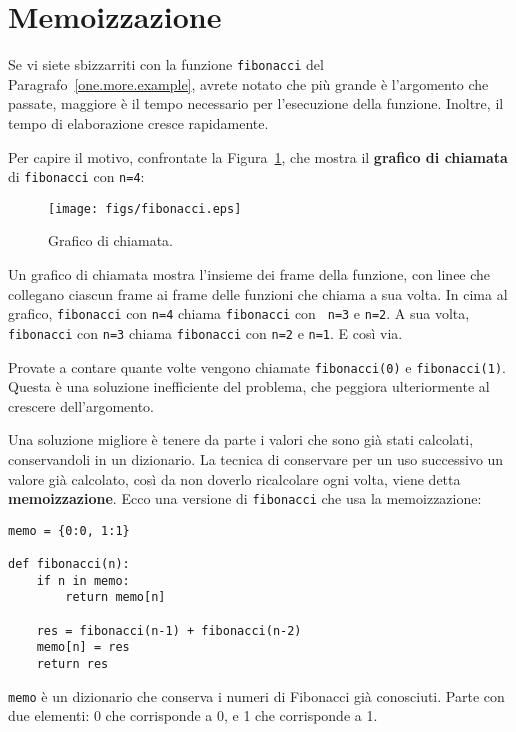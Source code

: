 \documentclass[10pt]{book}
\begin{document}
\section{Memoizzazione}
\label{memoize}

Se vi siete sbizzarriti con la funzione {\tt fibonacci} del Paragrafo~\ref{one.more.example}, avrete notato che più grande è l'argomento che passate, maggiore è il tempo necessario per l'esecuzione della funzione. Inoltre, il tempo di elaborazione cresce rapidamente.

Per capire il motivo, confrontate la Figura~\ref{fig.fibonacci}, che mostra il {\bf grafico di chiamata} di {\tt fibonacci} con {\tt n=4}:

\begin{figure}
\centerline
{\texttt{[image: figs/fibonacci.eps]}}
\caption{Grafico di chiamata.}
\label{fig.fibonacci}
\end{figure}

Un grafico di chiamata mostra l'insieme dei frame della funzione, con linee che collegano ciascun frame ai frame delle funzioni che chiama a sua volta. In cima al grafico, {\tt fibonacci} con {\tt n=4} chiama {\tt fibonacci} con {\tt
n=3} e {\tt n=2}.  A sua volta, {\tt fibonacci} con {\tt n=3} chiama
{\tt fibonacci} con {\tt n=2} e {\tt n=1}.  E così via.

Provate a contare quante volte vengono chiamate {\tt fibonacci(0)} e {\tt fibonacci(1)}. Questa è una soluzione inefficiente del problema, che peggiora ulteriormente al crescere dell'argomento.

Una soluzione migliore è tenere da parte i valori che sono già stati calcolati, conservandoli in un dizionario. La tecnica di conservare per un uso successivo un valore già calcolato, così da non doverlo ricalcolare ogni volta, viene detta {\bf memoizzazione}.  Ecco una versione di {\tt fibonacci} che usa la memoizzazione:

\begin{verbatim}
memo = {0:0, 1:1}

def fibonacci(n):
    if n in memo:
        return memo[n]

    res = fibonacci(n-1) + fibonacci(n-2)
    memo[n] = res
    return res
\end{verbatim}
%
{\tt memo} è un dizionario che conserva i numeri di Fibonacci già conosciuti. Parte con due elementi: 0 che corrisponde a 0, e 1 che corrisponde a 1.
\end{document}

